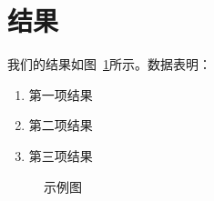 \section{结果}
\label{sec:results}

我们的结果如图~\ref{fig:example}所示。数据表明：
\begin{enumerate}
    \item 第一项结果
    \item 第二项结果
    \item 第三项结果
\end{enumerate}

\begin{figure}[h]
    \centering
    \caption{示例图}
    \label{fig:example}
\end{figure}